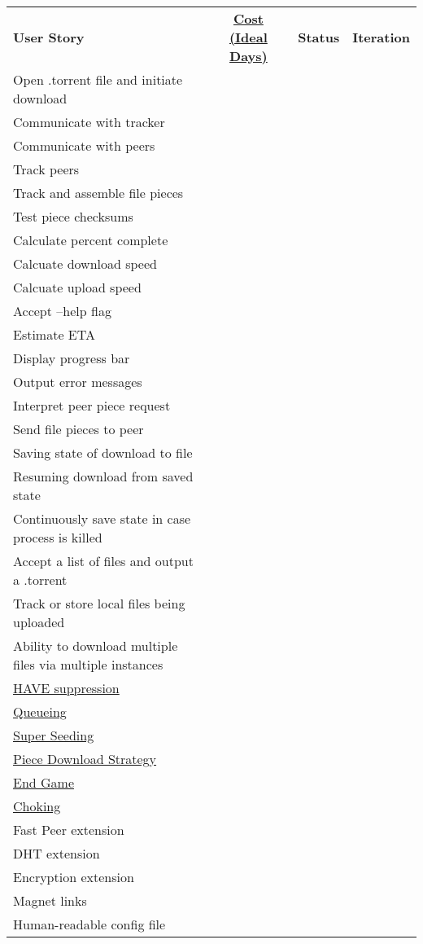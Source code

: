 \documentclass[letter]{scrartcl}
\begin{document}
\begin{tabularx}{\textwidth}{X c c c}
\textbf{User Story} & \href{http://c2.com/cgi/wiki?IdealProgrammingTime}{\textbf{Cost (Ideal Days)}}
& \textbf{Status} & \textbf{Iteration} \\
Open .torrent file and initiate download \\
Communicate with tracker \\
Communicate with peers \\
Track peers \\
Track and assemble file pieces \\
Test piece checksums \\
Calculate percent complete \\
Calcuate download speed \\
Calcuate upload speed \\
Accept --help flag \\
Estimate ETA \\
Display progress bar \\
Output error messages \\
Interpret peer piece request \\
Send file pieces to peer \\
Saving state of download to file \\
Resuming download from saved state \\
Continuously save state in case process is killed \\
Accept a list of files and output a .torrent \\
Track or store local files being uploaded \\
Ability to download multiple files via multiple instances \\
\href{https://wiki.theory.org/BitTorrentSpecification\#have:_.3Clen.3D0005.3E.3Cid.3D4.3E.3Cpiece_index.3E}{HAVE suppression} \\
\href{https://wiki.theory.org/BitTorrentSpecification\#Queuing}{Queueing} \\
\href{https://wiki.theory.org/BitTorrentSpecification\#Super_Seeding}{Super Seeding} \\
\href{https://wiki.theory.org/BitTorrentSpecification\#Piece_downloading_strategy}{Piece Download Strategy} \\
\href{https://wiki.theory.org/BitTorrentSpecification\#End_Game}{End Game} \\
\href{https://wiki.theory.org/BitTorrentSpecification\#Choking_and_Optimistic_Unchoking}{Choking} \\
Fast Peer extension \\
DHT extension \\
Encryption extension \\
Magnet links \\
Human-readable config file
\end{tabularx}
\end{document}
